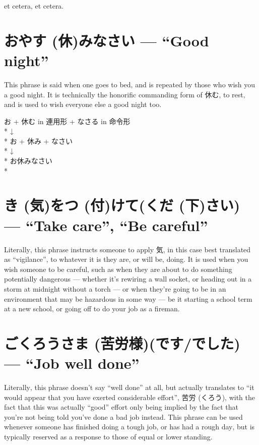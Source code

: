 \documentclass[11pt, b5paper, twoside, openright, onecolumn]{book}
\makeatletter
\newcommand*{\rubystack}[2]{{\relscale{0.5}%
  \begin{tabular}[b]{@{}c@{}}%
    {#1}\\%
   {\textscale{2}{#2}}%
  \end{tabular}}%
}
\DeclareRobustCommand*{\ruby}[2]{%
  \mbox{%
    \setlength{\parskip}{0ex}%
    \BeginAccSupp{method=pdfstringdef,ActualText={#1}}%
      \rubystack{\phantom{#2}}{#1}%
      \llap{%
        \rubystack{#2}{\phantom{#1}}%
      }%
    \EndAccSupp{}%
  }%
}
\renewcommand*{\ruby}[2]{#2 (#1)}%
\newenvironment{exampleblock}{
\setlength{\parindent}{0.6in}
\begin{minipage}[t]{\dimexpr\textwidth-\parindent}}
{\end{minipage}}
\makeatother
\begin{document}
et cetera‚ et cetera.

\section*{お\ruby{休}{やす}みなさい — “Good night”}

This phrase is said when one goes to bed‚ and is repeated by those who wish you a good night. It is technically the honorific commanding form of 休む‚ to rest‚ and is used to wish everyone else a good night too.

\vspace{0.4cm}
\begin{exampleblock}
お + 休む in 連用形 + なさる in 命令形 \\* 
↓ \\* 
お + 休み + なさい \\* 
↓ \\* 
お休みなさい \\* 
\end{exampleblock}
\section*{\ruby{気}{き}を\ruby{付}{つ}けて(\ruby{下}{くだ}さい) — “Take care”‚ “Be careful”}


Literally‚ this phrase instructs someone to apply 気‚ in this case best translated as “vigilance”‚ to whatever it is they are‚ or will be‚ doing. It is used when you wish someone to be careful‚ such as when they are about to do something potentially dangerous — whether it’s rewiring a wall socket‚ or heading out in a storm at midnight without a torch — or when they’re going to be in an environment that may be hazardous in some way — be it starting a school term at a new school‚ or going off to do your job as a fireman.

\section*{ご\ruby{苦労様}{くろうさま}(です/でした) — “Job well done”}

Literally‚ this phrase doesn’t say “well done” at all‚ but actually translates to “it would appear that you have exerted considerable effort”‚ 苦労 (くろう)‚ with the fact that this was actually “good” effort only being implied by the fact that you’re not being told you’ve done a bad job instead. This phrase can be used whenever someone has finished doing a tough job‚ or has had a rough day‚ but is typically reserved as a response to those of equal or lower standing.
\end{document}
